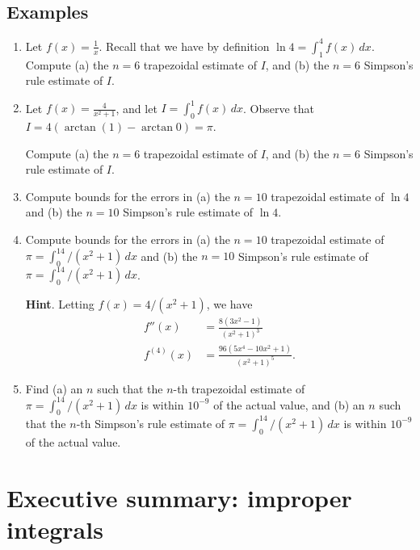 \subsection*{Examples}
\begin{enumerate}
  \item Let $f(x)=\frac{1}{x}$. Recall that we have by definition $\ln 4=\int_1^4f(x)\, dx$. Compute (a) the $n=6$ trapezoidal estimate of $I$, and (b) the $n=6$ Simpson's rule estimate of $I$.
  \item Let $f(x)=\frac{4}{x^2+1}$, and let $I=\int_0^1f(x)\, dx$. Observe that $I=4(\arctan(1)-\arctan 0)=\pi$.

  Compute (a) the $n=6$ trapezoidal estimate of $I$, and (b) the $n=6$ Simpson's rule estimate of $I$.

  \item Compute bounds for the errors in (a) the $n=10$ trapezoidal estimate of $\ln 4$ and (b) the $n=10$ Simpson's rule estimate of $\ln 4$.

  \item Compute bounds for the errors in (a) the $n=10$ trapezoidal estimate of $\pi=\int_0^14/(x^2+1)\, dx$ and (b) the $n=10$ Simpson's rule estimate of $\pi=\int_0^14/(x^2+1)\, dx$.

  {\bf Hint}. Letting $f(x)=4/(x^2+1)$, we have
  \begin{align*}
    f''(x)&=\frac{8(3x^2-1)}{(x^2+1)^3}\\
    f^{(4)}(x)&=\frac{96(5x^4-10x^2+1)}{(x^2+1)^5}.
  \end{align*}
  \item Find (a) an $n$ such that the $n$-th trapezoidal estimate of $\pi=\int_0^14/(x^2+1)\, dx$ is within $10^{-9}$ of the actual value, and (b) an $n$ such that the $n$-th Simpson's rule estimate of $\pi=\int_0^14/(x^2+1)\, dx$ is within $10^{-9}$ of the actual value.
\end{enumerate}




\newpage

\section{Executive summary: improper integrals}

\thispagestyle{fancy}
